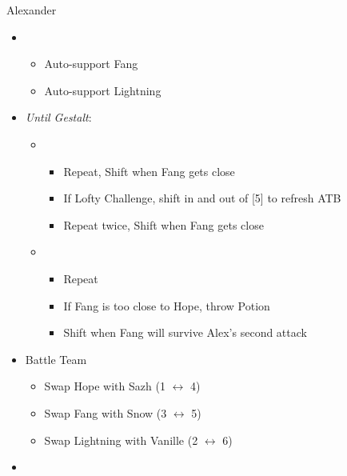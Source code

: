 \begin{paracol}{2}
\begin{battle}{Alexander}
\begin{itemize}
			\item \second
			      \begin{itemize}
				      \item Auto-support Fang
				      \item Auto-support Lightning
			      \end{itemize}
			\item \textit{Until Gestalt}:
			      \begin{itemize}
				      \item \sixth
				            \begin{itemize}
					            \item Repeat, Shift when Fang gets close
					            \item If Lofty Challenge, shift in and out of [5] to refresh ATB
					            \item Repeat twice, Shift when Fang gets close
				            \end{itemize}
				      \item \first
				            \begin{itemize}
					            \item Repeat
					            \item If Fang is too close to Hope, throw Potion
					            \item Shift when Fang will survive Alex's second attack
				            \end{itemize}
			      \end{itemize}
		\end{itemize}
	\end{battle}
	\switchcolumn*
	\begin{menu}
		\begin{itemize}
			\paradigm
			\begin{itemize}
				\item Battle Team
				      \begin{itemize}
					      \item Swap Hope with Sazh (1 $\leftrightarrow$ 4)
					      \item Swap Fang with Snow (3 $\leftrightarrow$ 5)
					      \item Swap Lightning with Vanille (2 $\leftrightarrow$ 6)
				      \end{itemize}
				\item {}%
				      {\paradigmline{\com}{\med}{(\com)}}%
				      {\paradigmline{\com}{(\sab)}{\rav}}%
				      {\paradigmline{\syn}{\med}{(\com)}}%

\end{itemize}
\end{itemize}
\end{menu}
\end{paracol}
